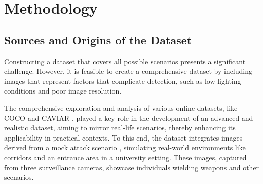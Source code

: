 \chapter{Methodology}
\label{chapter:architecture}

\newenvironment{architecture}
{\quote\itshape}
{\endquote}

\begin{architecture}
\end{architecture}

\section{Sources and Origins of the Dataset}
Constructing a dataset that covers all possible scenarios presents a significant challenge. However, it is feasible to create a comprehensive dataset by including images that represent factors that complicate detection, such as low lighting conditions and poor image resolution. 

The comprehensive exploration and analysis of various online datasets, like COCO \cite{rfc16} and CAVIAR \cite{rfc30}, played a key role in the development of an advanced and realistic dataset, aiming to mirror real-life scenarios, thereby enhancing its applicability in practical contexts. To this end, the dataset integrates images derived from a mock attack scenario \cite{rfc45}, simulating real-world environments like corridors and an entrance area in a university setting. These images, captured from three surveillance cameras, showcase individuals wielding weapons and other scenarios. 

